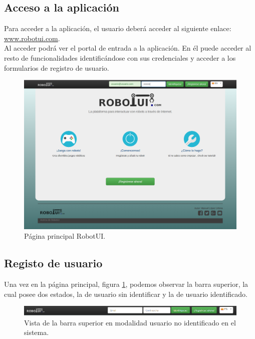 \subsection{ Acceso a la aplicación }
\label{sec:acceso-aplicacion}

Para acceder a la aplicación, el usuario deberá acceder al siguiente enlace: \url{www.robotui.com}. \\

Al acceder podrá ver el portal de entrada a la aplicación. En él puede acceder al resto de funcionalidades identificándose con sus credenciales y acceder a los formularios de registro
de usuario.\\

\begin{figure}[H]
  \begin{center}
    \includegraphics[scale=0.3]{imagenes/manual-usuario/pagina-principal.png}
  \end{center}
  \caption{Página principal RobotUI.}
  \label{website:pagina-principal}
\end{figure}

\subsection{ Registo de usuario }
\label{sec:creacion-usuario}

Una vez en la página principal, figura \ref{website:pagina-principal}, podemos observar la barra superior, la cual posee dos estados, la de usuario sin identificar y la de usuario identificado.

\begin{figure}[H]
  \begin{center}
    \includegraphics[scale=0.5]{imagenes/manual-usuario/barra-menu1.png}
  \end{center}
  \caption{Vista de la barra superior en modalidad usuario no identificado en el sistema.}
  \label{website:barra-inicial}
\end{figure}

